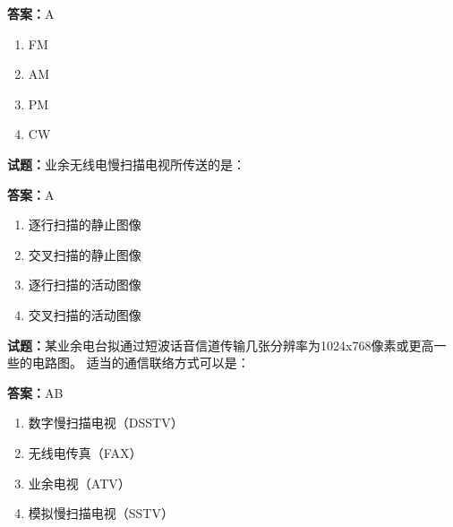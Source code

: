 \documentclass{ctexbook}
\begin{document}
\textbf{答案：}A 

\begin{enumerate}[leftmargin=3em]
  \item FM 

  \item AM 

  \item PM 

  \item CW 

\end{enumerate}





\vspace{1em}

\textbf{试题：}业余无线电慢扫描电视所传送的是： 

\textbf{答案：}A 

\begin{enumerate}[leftmargin=3em]
  \item 逐行扫描的静止图像 

  \item 交叉扫描的静止图像 

  \item 逐行扫描的活动图像 

  \item 交叉扫描的活动图像 

\end{enumerate}





\vspace{1em}

\textbf{试题：}某业余电台拟通过短波话音信道传输几张分辨率为1024x768像素或更高一些的电路图。
适当的通信联络方式可以是： 

\textbf{答案：}AB 

\begin{enumerate}[leftmargin=3em]
  \item 数字慢扫描电视（DSSTV） 


  \item 无线电传真（FAX） 

  \item 业余电视（ATV） 

  \item 模拟慢扫描电视（SSTV） 

\end{enumerate}
\end{document}
